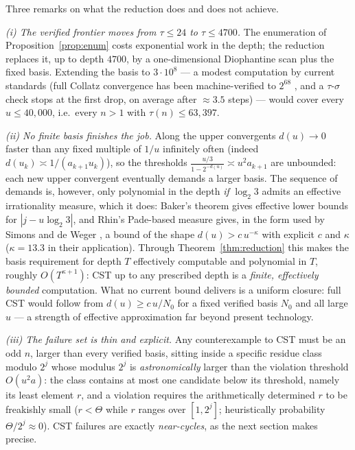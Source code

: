 \documentclass[10pt]{article}
\theoremstyle{definition}
\theoremstyle{remark}
\newcommand{\lb}{\log_2 3}
\begin{document}
Three remarks on what the reduction does and does not achieve.

\emph{(i) The verified frontier moves from $\tau \le 24$ to $\tau \le 4700$.}
The enumeration of Proposition~\ref{prop:enum} costs exponential work in the
depth; the reduction replaces it, up to depth $4700$, by a one-dimensional
Diophantine scan plus the fixed basis. Extending the basis to
$3\cdot 10^{8}$ --- a modest computation by current standards (full Collatz
convergence has been machine-verified to $2^{68}$ \cite{Barina2021}, and a
$\tau$-$\sigma$ check stops at the first drop, on average after $\approx 3.5$
steps) --- would cover every $u \le 40{,}000$, i.e.\ every $n>1$ with
$\tau(n) \le 63{,}397$.

\emph{(ii) No finite basis finishes the job.} Along the upper convergents
$d(u) \to 0$ faster than any fixed multiple of $1/u$ infinitely often
(indeed $d(u_k) \asymp 1/(a_{k+1} u_k)$), so the thresholds
$\tfrac{u/3}{1-2^{-d(u)}} \asymp u^{2} a_{k+1}$ are unbounded: each new upper
convergent eventually demands a larger basis. The sequence of demands is,
however, only polynomial in the depth \emph{if} $\lb$ admits an effective
irrationality measure, which it does: Baker's theorem \cite{Baker1966} gives
effective lower bounds for $|j - u\lb|$, and Rhin's Pade-based measure
\cite{Rhin1987} gives, in the form used by Simons and de Weger
\cite{SimonsDeWeger2005}, a bound of the shape $d(u) > c\, u^{-\kappa}$ with
explicit $c$ and $\kappa$ ($\kappa = 13.3$ in their application). Through
Theorem~\ref{thm:reduction} this makes the basis requirement for depth $T$
effectively computable and polynomial in $T$, roughly $O(T^{\kappa + 1})$:
CST up to any prescribed depth is a \emph{finite, effectively bounded}
computation. What no current bound delivers is a uniform closure: full CST
would follow from $d(u) \ge c\,u/N_0$ for a fixed verified basis $N_0$ and
all large $u$ --- a strength of effective approximation far beyond present
technology.

\emph{(iii) The failure set is thin and explicit.} Any counterexample to CST
must be an odd $n$, larger than every verified basis, sitting inside a
specific residue class modulo $2^{j}$ whose modulus $2^{j}$ is
\emph{astronomically} larger than the violation threshold $O(u^{2}a)$: the
class contains at most one candidate below its threshold, namely its least
element $r$, and a violation requires the arithmetically determined $r$ to be
freakishly small ($r < \Theta$ while $r$ ranges over $[1, 2^{j}]$;
heuristically probability $\Theta/2^{j} \approx 0$). CST failures are exactly
\emph{near-cycles}, as the next section makes precise.
\end{document}
